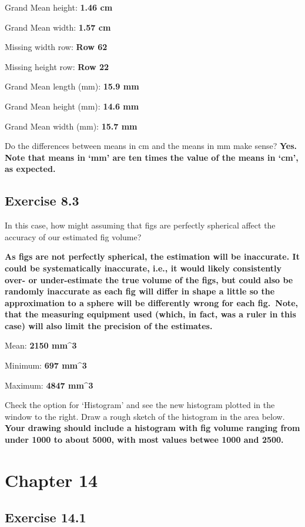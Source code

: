 \documentclass[
]{scrbook}
\begin{document}
Grand Mean height: \textbf{1.46 cm}

Grand Mean width: \textbf{1.57 cm}

Missing width row: \textbf{Row 62}

Missing height row: \textbf{Row 22}

Grand Mean length (mm): \textbf{15.9 mm}

Grand Mean height (mm): \textbf{14.6 mm}

Grand Mean width (mm): \textbf{15.7 mm}

Do the differences between means in cm and the means in mm make sense? \textbf{Yes. Note that means in `mm' are ten times the value of the means in `cm', as expected.}

\hypertarget{exercise-8.3}{%
\subsection{Exercise 8.3}\label{exercise-8.3}}

In this case, how might assuming that figs are perfectly spherical affect the accuracy of our estimated fig volume?

\textbf{As figs are not perfectly spherical, the estimation will be inaccurate. It could be systematically inaccurate, i.e., it would likely consistently over- or under-estimate the true volume of the figs, but could also be randomly inaccurate as each fig will differ in shape a little so the approximation to a sphere will be differently wrong for each fig.~Note, that the measuring equipment used (which, in fact, was a ruler in this case) will also limit the precision of the estimates.}

Mean: \textbf{2150 mm\^{}3}

Minimum: \textbf{697 mm\^{}3}

Maximum: \textbf{4847 mm\^{}3}

Check the option for `Histogram' and see the new histogram plotted in the window to the
right. Draw a rough sketch of the histogram in the area below. \textbf{Your drawing should include a histogram with fig volume ranging from under 1000 to about 5000, with most values betwee 1000 and 2500.}

\hypertarget{chapter-14}{%
\section{Chapter 14}\label{chapter-14}}

\hypertarget{exercise-14.1}{%
\subsection{Exercise 14.1}\label{exercise-14.1}}
\end{document}
